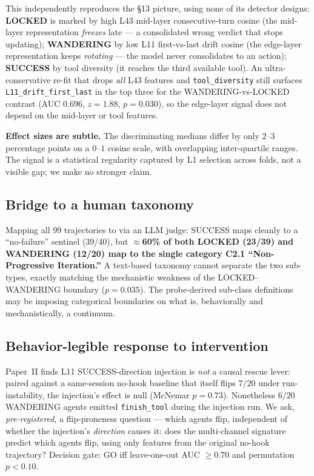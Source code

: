 \documentclass[11pt]{article}
\begin{document}
This independently reproduces the \cite{toolentropy2026} \S13 picture, using none of its detector designs: \textbf{LOCKED} is marked by high L43 mid-layer consecutive-turn cosine (the mid-layer representation \emph{freezes} late --- a consolidated wrong verdict that stops updating); \textbf{WANDERING} by low L11 first-vs-last drift cosine (the edge-layer representation keeps \emph{rotating} --- the model never consolidates to an action); \textbf{SUCCESS} by tool diversity (it reaches the third available tool). An ultra-conservative re-fit that drops \emph{all} L43 features and \texttt{tool\_diversity} still surfaces \texttt{L11\_drift\_first\_last} in the top three for the WANDERING-vs-LOCKED contrast (AUC $0.696$, $z{=}1.88$, $p{=}0.030$), so the edge-layer signal does not depend on the mid-layer or tool features.

\textbf{Effect sizes are subtle.} The discriminating medians differ by only $2$--$3$ percentage points on a $0$--$1$ cosine scale, with overlapping inter-quartile ranges. The signal is a statistical regularity captured by L1 selection across folds, not a visible gap; we make no stronger claim.

\subsection{Bridge to a human taxonomy}

Mapping all 99 trajectories to \cite{liu2026failures} via an LLM judge: SUCCESS maps cleanly to a ``no-failure'' sentinel (39/40), but \textbf{$\approx$60\% of both LOCKED (23/39) and WANDERING (12/20) map to the single category C2.1 ``Non-Progressive Iteration.''} A text-based taxonomy cannot separate the two sub-types, exactly matching the mechanistic weakness of the LOCKED--WANDERING boundary ($p{=}0.035$). The probe-derived sub-class definitions may be imposing categorical boundaries on what is, behaviorally and mechanistically, a continuum.

\subsection{Behavior-legible response to intervention}

Paper~II finds L11 SUCCESS-direction injection is \emph{not} a causal rescue lever: paired against a same-session no-hook baseline that itself flips $7/20$ under run-instability, the injection's effect is null (McNemar $p{=}0.73$). Nonetheless $6/20$ WANDERING agents emitted \texttt{finish\_tool} during the injection run. We ask, \emph{pre-registered}, a flip-proneness question --- which agents flip, independent of whether the injection's \emph{direction} causes it: does the multi-channel signature predict which agents flip, using only features from the original no-hook trajectory? Decision gate: GO iff leave-one-out AUC $\ge 0.70$ and permutation $p < 0.10$.
\end{document}

